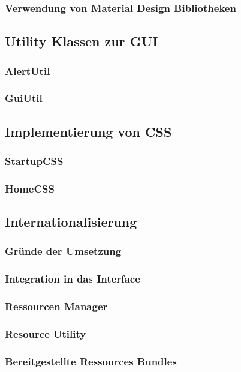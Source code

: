 \subsubsection{Verwendung von Material Design Bibliotheken}

\subsection{Utility Klassen zur GUI}
\subsubsection{AlertUtil}
\subsubsection{GuiUtil}


\subsection{Implementierung von CSS}
\subsubsection{StartupCSS}
\subsubsection{HomeCSS}
\subsection{Internationalisierung}
\subsubsection{Gründe der Umsetzung}
\subsubsection{Integration in das Interface}
\subsubsection{Ressourcen Manager}
\subsubsection{Resource Utility}
\subsubsection{Bereitgestellte Ressources Bundles}

